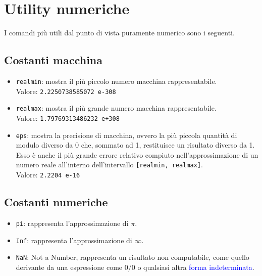 \chapter{Utility numeriche}
I comandi più utili dal punto di vista puramente numerico sono i seguenti.

\section{Costanti macchina}
\begin{itemize}

	\item	\texttt{realmin}: mostra il più piccolo numero macchina rappresentabile. \\
			Valore: \texttt{2.2250738585072 e-308}
	
	\item 	\texttt{realmax}: mostra il più grande numero macchina rappresentabile. \\
			Valore: \texttt{1.79769313486232 e+308}
			
	\item	\texttt{eps}: mostra la precisione di macchina, ovvero la più piccola quantità di modulo diverso da 0
			che, sommato ad 1, restituisce un risultato diverso da 1. Esso è anche il più grande errore relativo
			compiuto nell'approssimazione di un numero reale all'interno dell'intervallo \texttt{[realmin, 
			realmax]}. \\
			Valore: \texttt{2.2204 e-16}

\end{itemize}

\section{Costanti numeriche}
\begin{itemize}

	\item 	\texttt{pi}: rappresenta l'approssimazione di $\pi$.
	
	\item 	\texttt{Inf}: rappresenta l'approssimazione di $\infty$.
			
	\item	\texttt{NaN}: Not a Number, rappresenta un risultato non computabile, come quello derivante da una
			espressione come $0/0$ o qualsiasi altra \textcolor{blue}{forma indeterminata}.
		
\end{itemize}

